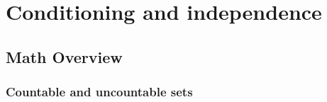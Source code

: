 
\chapter{Conditioning and independence} %

\label{Unit 2} %


\section{Math Overview}

\subsection{Countable and uncountable sets}
\begin{outline}
\end{outline}







